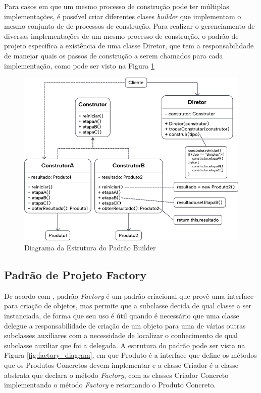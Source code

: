 \documentclass[12pt, %
openright, 
oneside, %
a4paper,    %
brazil]{facom-ufu-abntex2}
\begin{document}
Para casos em que um mesmo processo de construção pode ter múltiplas implementações, é possível criar diferentes clases \textit{builder} que implementam o mesmo conjunto de de processos de construção. Para realizar o gerenciamento de diversas implementações de um mesmo processo de construção, o padrão de projeto especifica a existência de uma classe Diretor, que tem a responsabilidade de manejar quais os passos de construção a serem chamados para cada implementação, como pode ser visto na Figura \ref{fig:builder_diagram}

\begin{figure}[ht]
    \centering
    \includegraphics[width=.65\textwidth]{figures/design_patterns/builder_diagram.png}
    \caption{Diagrama da Estrutura do Padrão Builder}
    \label{fig:builder_diagram}
\end{figure}

\subsection{Padrão de Projeto Factory}

De acordo com , padrão \textit{Factory} é um padrão criacional que provê uma interface para criação de objetos, mas permite que a subclasse decida de qual classe a ser instanciada, de forma que seu uso é útil quando é necessário que uma classe delegue a responsabilidade de criação de um objeto para uma de várias outras subclasses auxiliares com a necessidade de localizar o conhecimento de qual subclasse auxiliar que foi a delegada. A estrutura do padrão pode ser vista na Figura \ref{fig:factory_diagram}, em que Produto é a interface que define os métodos que os Produtos Concretos devem implementar e a classe Criador é a classe abstrata que declara o método \textit{Factory}, com as classes Criador Concreto implementando o método \textit{Factory} e retornando o Produto Concreto.
\end{document}
